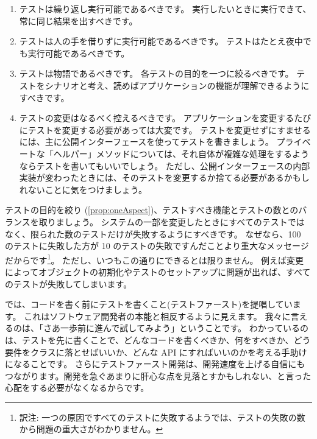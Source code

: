 \documentclass[a4paper,10pt,twoside]{book}
\begin{document}
\begin{enumerate}
\item テストは繰り返し実行可能であるべきです。
  実行したいときに実行できて、常に同じ結果を出すべきです。

\item テストは人の手を借りずに実行可能であるべきです。
  テストはたとえ夜中でも実行可能であるべきです。

\item テストは物語であるべきです。
  各テストの目的を一つに絞るべきです。
  テストをシナリオと考え、読めばアプリケーションの機能が理解できるようにすべきです。\label{prop:oneAspect}

\item テストの変更はなるべく控えるべきです。
  アプリケーションを変更するたびにテストを変更する必要があっては大変です。
  テストを変更せずにすませるには、主に公開インターフェースを使ってテストを書きましょう。
  プライベートな「ヘルパー」メソッドについては、それ自体が複雑な処理をするようならテストを書いてもいいでしょう。
  ただし、公開インターフェースの内部実装が変わったときには、そのテストを変更するか捨てる必要があるかもしれないことに気をつけましょう。
\end{enumerate}

テストの目的を絞り (\ref{prop:oneAspect})、テストすべき機能とテストの数とのバランスを取りましょう。
システムの一部を変更したときにすべてのテストではなく、限られた数のテストだけが失敗するようにすべきです。
なぜなら、100 のテストに失敗した方が 10 のテストの失敗ですんだことより重大なメッセージだからです\footnote{訳注: 一つの原因ですべてのテストに失敗するようでは、テストの失敗の数から問題の重大さがわかりません。}。%
ただし、いつもこの通りにできるとは限りません。
例えば変更によってオブジェクトの初期化やテストのセットアップに問題が出れば、すべてのテストが失敗してしまいます。

 では、コードを書く前にテストを書くこと(テストファースト)を提唱しています。
これはソフトウェア開発者の本能と相反するように見えます。
我々に言えるのは、「さあ一歩前に進んで試してみよう」ということです。 
わかっているのは、テストを先に書くことで、どんなコードを書くべきか、何をすべきか、どう要件をクラスに落とせばいいか、どんな API にすればいいのかを考える手助けになることです。
さらにテストファースト開発は、開発速度を上げる自信にもつながります。開発を急ぐあまりに肝心な点を見落とすかもしれない、と言った心配をする必要がなくなるからです。
\end{document}
